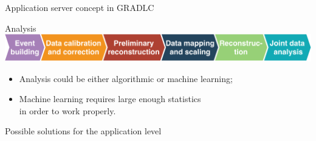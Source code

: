 
\begin{frame}{Application server concept in GRADLC}

\end{frame}


\begin{frame}{Analysis}
    \includegraphics[width=1\textwidth]{pics/an_steps.pdf}
    \vspace{2em}
    \begin{itemize}
        \item Analysis could be either algorithmic or machine learning;
        \item Machine learning requires large enough statistics\\in order to work properly.
    \end{itemize}
\end{frame}



\begin{frame}{Possible solutions for the application level}
 
\end{frame}
